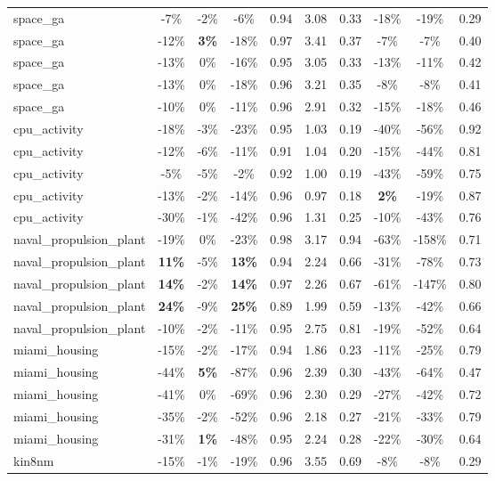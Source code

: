 \begin{table}[!htbp]
\begin{small}
\begin{sc}
{\begin{tabular}{lccccccccc}
space\_ga & -7\% & -2\% & -6\% & 0.94 & 3.08 & 0.33 & -18\% & -19\% & 0.29 \\
space\_ga & -12\% & \textbf{3\%} & -18\% & 0.97 & 3.41 & 0.37 & -7\% & -7\% & 0.40 \\
space\_ga & -13\% & 0\% & -16\% & 0.95 & 3.05 & 0.33 & -13\% & -11\% & 0.42 \\
space\_ga & -13\% & 0\% & -18\% & 0.96 & 3.21 & 0.35 & -8\% & -8\% & 0.41 \\
space\_ga & -10\% & 0\% & -11\% & 0.96 & 2.91 & 0.32 & -15\% & -18\% & 0.46 \\
cpu\_activity & -18\% & -3\% & -23\% & 0.95 & 1.03 & 0.19 & -40\% & -56\% & 0.92 \\
cpu\_activity & -12\% & -6\% & -11\% & 0.91 & 1.04 & 0.20 & -15\% & -44\% & 0.81 \\
cpu\_activity & -5\% & -5\% & -2\% & 0.92 & 1.00 & 0.19 & -43\% & -59\% & 0.75 \\
cpu\_activity & -13\% & -2\% & -14\% & 0.96 & 0.97 & 0.18 & \textbf{2\%} & -19\% & 0.87 \\
cpu\_activity & -30\% & -1\% & -42\% & 0.96 & 1.31 & 0.25 & -10\% & -43\% & 0.76 \\
naval\_propulsion\_plant & -19\% & 0\% & -23\% & 0.98 & 3.17 & 0.94 & -63\% & -158\% & 0.71 \\
naval\_propulsion\_plant & \textbf{11\%} & -5\% & \textbf{13\%} & 0.94 & 2.24 & 0.66 & -31\% & -78\% & 0.73 \\
naval\_propulsion\_plant & \textbf{14\%} & -2\% & \textbf{14\%} & 0.97 & 2.26 & 0.67 & -61\% & -147\% & 0.80 \\
naval\_propulsion\_plant & \textbf{24\%} & -9\% & \textbf{25\%} & 0.89 & 1.99 & 0.59 & -13\% & -42\% & 0.66 \\
naval\_propulsion\_plant & -10\% & -2\% & -11\% & 0.95 & 2.75 & 0.81 & -19\% & -52\% & 0.64 \\
miami\_housing & -15\% & -2\% & -17\% & 0.94 & 1.86 & 0.23 & -11\% & -25\% & 0.79 \\
miami\_housing & -44\% & \textbf{5\%} & -87\% & 0.96 & 2.39 & 0.30 & -43\% & -64\% & 0.47 \\
miami\_housing & -41\% & 0\% & -69\% & 0.96 & 2.30 & 0.29 & -27\% & -42\% & 0.72 \\
miami\_housing & -35\% & -2\% & -52\% & 0.96 & 2.18 & 0.27 & -21\% & -33\% & 0.79 \\
miami\_housing & -31\% & \textbf{1\%} & -48\% & 0.95 & 2.24 & 0.28 & -22\% & -30\% & 0.64 \\
kin8nm & -15\% & -1\% & -19\% & 0.96 & 3.55 & 0.69 & -8\% & -8\% & 0.29 \\

\end{tabular}}
\end{sc}
\end{small}
\end{table}
